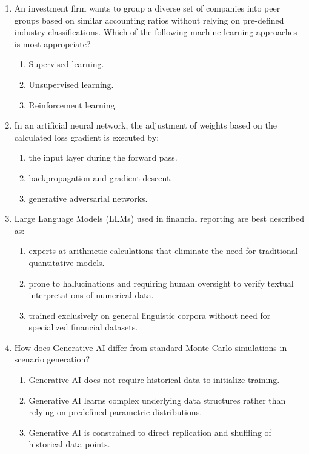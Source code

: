 \begin{enumerate}
	\item An investment firm wants to group a diverse set of companies into peer groups based on similar accounting ratios without relying on pre-defined industry classifications. Which of the following machine learning approaches is most appropriate?
	      \begin{enumerate}[label=\Alph*.]
		      \item Supervised learning.
		      \item Unsupervised learning.
		      \item Reinforcement learning.
	      \end{enumerate}

	\item In an artificial neural network, the adjustment of weights based on the calculated loss gradient is executed by:
	      \begin{enumerate}[label=\Alph*.]
		      \item the input layer during the forward pass.
		      \item backpropagation and gradient descent.
		      \item generative adversarial networks.
	      \end{enumerate}

	\item Large Language Models (LLMs) used in financial reporting are best described as:
	      \begin{enumerate}[label=\Alph*.]
		      \item experts at arithmetic calculations that eliminate the need for traditional quantitative models.
		      \item prone to hallucinations and requiring human oversight to verify textual interpretations of numerical data.
		      \item trained exclusively on general linguistic corpora without need for specialized financial datasets.
	      \end{enumerate}

	\item How does Generative AI differ from standard Monte Carlo simulations in scenario generation?
	      \begin{enumerate}[label=\Alph*.]
		      \item Generative AI does not require historical data to initialize training.
		      \item Generative AI learns complex underlying data structures rather than relying on predefined parametric distributions.
		      \item Generative AI is constrained to direct replication and shuffling of historical data points.
	      \end{enumerate}


\end{enumerate}

